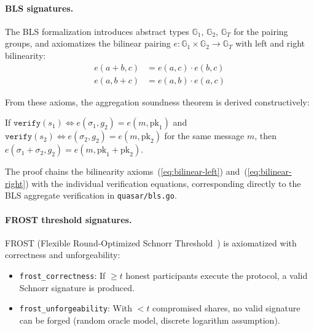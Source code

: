 \paragraph{BLS signatures.}
The BLS formalization introduces abstract types $\mathbb{G}_1$, $\mathbb{G}_2$, $\mathbb{G}_T$ for the
pairing groups, and axiomatizes the bilinear pairing $e : \mathbb{G}_1 \times \mathbb{G}_2 \to \mathbb{G}_T$
with left and right bilinearity:
\begin{align}
e(a + b, c) &= e(a, c) \cdot e(b, c) \label{eq:bilinear-left} \\
e(a, b + c) &= e(a, b) \cdot e(a, c) \label{eq:bilinear-right}
\end{align}

From these axioms, the aggregation soundness theorem is derived constructively:

\begin{theorem}
\label{thm:formal-bls}
If $\texttt{verify}(s_1) \Leftrightarrow e(\sigma_1, g_2) = e(m, \text{pk}_1)$ and
$\texttt{verify}(s_2) \Leftrightarrow e(\sigma_2, g_2) = e(m, \text{pk}_2)$ for the same
message $m$, then
$e(\sigma_1 + \sigma_2, g_2) = e(m, \text{pk}_1 + \text{pk}_2)$.
\end{theorem}

The proof chains the bilinearity axioms~(\ref{eq:bilinear-left}) and~(\ref{eq:bilinear-right})
with the individual verification equations, corresponding directly to the BLS aggregate
verification in \texttt{quasar/bls.go}.

\paragraph{FROST threshold signatures.}
FROST (Flexible Round-Optimized Schnorr Threshold~\cite{komlo2020frost}) is axiomatized
with correctness and unforgeability:
\begin{itemize}[nosep]
\item \texttt{frost\_correctness}: If $\geq t$ honest participants execute the protocol,
a valid Schnorr signature is produced.
\item \texttt{frost\_unforgeability}: With $< t$ compromised shares, no valid signature
can be forged (random oracle model, discrete logarithm assumption).
\end{itemize}

